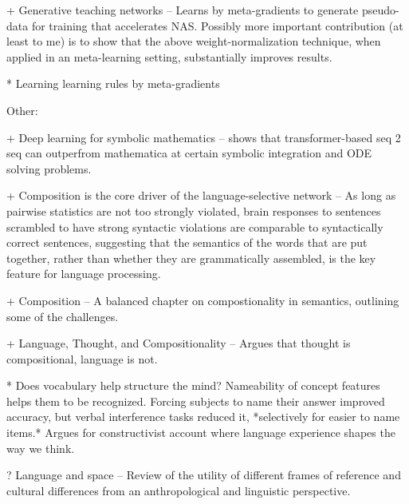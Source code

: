 + Generative teaching networks -- Learns by meta-gradients to generate pseudo-data for training that accelerates NAS. Possibly more important contribution (at least to me) is to show that the above weight-normalization technique, when applied in an meta-learning setting, substantially improves results. \citep{Such2019}

* Learning learning rules by meta-gradients \citep{Miconi2019}


Other:

+ Deep learning for symbolic mathematics -- shows that transformer-based seq 2 seq can outperfrom mathematica at certain symbolic integration and ODE solving problems. \citep{Lample2019} 

+ Composition is the core driver of the language-selective network -- As long as pairwise statistics are not too strongly violated, brain responses to sentences scrambled to have strong syntactic violations are comparable to syntactically correct sentences, suggesting that the semantics of the words that are put together, rather than whether they are grammatically assembled, is the key feature for language processing. \citep{Mollica2020}

+ Composition -- A balanced chapter on compostionality in semantics, outlining some of the challenges. \citep{Goldberg2015}

+ Language, Thought, and Compositionality -- Argues that thought is compositional, language is not. \citep{Fodor2001}

* Does vocabulary help structure the mind? Nameability of concept features helps them to be recognized. Forcing subjects to name their answer improved accuracy, but verbal interference tasks reduced it, *selectively for easier to name items.* Argues for constructivist account where language experience shapes the way we think. \citep{Lupyan2020}

? Language and space -- Review of the utility of different frames of reference and cultural differences from an anthropological and linguistic perspective. \citep{Levinson1996}
